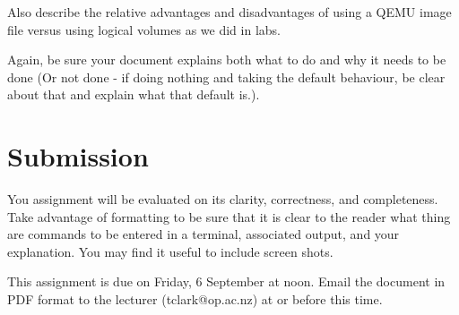 \documentclass{article}
\begin{document}
Also describe the relative advantages and disadvantages of using a QEMU image file versus using logical volumes as we did in labs. 

Again, be sure your document explains both what to do and why it needs to be done (Or not done - if
doing nothing and taking the default behaviour, be clear about that and explain what that default is.).

\section{Submission}
You assignment will be evaluated on its clarity, correctness, and completeness. Take advantage of formatting to be
sure that it is clear to the reader what thing are commands to be entered in a terminal, associated output, and your 
explanation. You may find it useful to include screen shots.

This assignment is due on Friday, 6 September at noon.  Email the document in PDF format to the lecturer (tclark@op.ac.nz) at or before this time.
\end{document}
